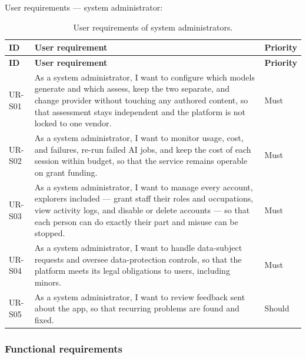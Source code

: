 User requirements --- system administrator:

{\small
\begin{longtable}{|>{\raggedright\arraybackslash}p{}|>{\raggedright\arraybackslash}p{}|>{\raggedright\arraybackslash}p{}|}
\caption{User requirements of system administrators.} \\
\hline
\textbf{ID} & \textbf{User requirement} & \textbf{Priority} \\ \hline
\endfirsthead
\hline
\textbf{ID} & \textbf{User requirement} & \textbf{Priority} \\ \hline
\endhead
UR-S01 & As a system administrator, I want to configure which models generate and which assess, keep the two separate, and change provider without touching any authored content, so that assessment stays independent and the platform is not locked to one vendor. & Must \\ \hline
UR-S02 & As a system administrator, I want to monitor usage, cost, and failures, re-run failed AI jobs, and keep the cost of each session within budget, so that the service remains operable on grant funding. & Must \\ \hline
UR-S03 & As a system administrator, I want to manage every account, explorers included --- grant staff their roles and occupations, view activity logs, and disable or delete accounts --- so that each person can do exactly their part and misuse can be stopped. & Must \\ \hline
UR-S04 & As a system administrator, I want to handle data-subject requests and oversee data-protection controls, so that the platform meets its legal obligations to users, including minors. & Must \\ \hline
UR-S05 & As a system administrator, I want to review feedback sent about the app, so that recurring problems are found and fixed. & Should \\ \hline
\end{longtable}
}

\subsubsection{Functional requirements}

